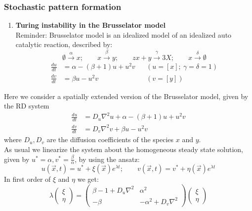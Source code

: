 \subsubsection{Stochastic pattern formation}
\begin{enumerate}[label={$\arabic*)$}]
	\item \textbf{Turing instability in the Brusselator model}\\
		Reminder: Brusselator model is an idealized model of an idealized auto catalytic reaction, described by:
		\begin{equation*}
			\emptyset \overset{\alpha}{\to} x;\qquad x\overset{\beta}{\to} y;\qquad zx+y\overset{\gamma}{\to}3X;\qquad x\overset{\delta}{\to}\emptyset
		\end{equation*}
		\begin{align*}
			\frac{du}{dt}&=\alpha-(\beta+1)u+u^2v & &(u=\left[x\right];\ \gamma=\delta=1)\\
			\frac{dv}{dt}&=\beta u-u^2v & &(v=\left[y\right])
		\end{align*}
\end{enumerate}
Here we consider a spatially extended version of the Brusselator model, given by the RD system
\begin{align*}
	\frac{du}{dt}&=D_u\nabla^2u+\alpha-(\beta +1)u+u^2v\\
	\frac{dv}{dt}&=D_v\nabla^2v+\beta u-u^2v
\end{align*}
where $D_u,D_v$ are the diffusion coefficients of the species $x$ and $y$.\\
As usual we linearize the system about the homogeneous steady state solution, given by $u^*=\alpha,v^*=\frac{\beta}{\alpha}$, by using the ansatz:
\begin{equation*}
	u(\vec{x},t)=u^*+\xi(\vec{x})e^{\lambda t};\qquad v(\vec{x},t)=v^*+\eta(\vec{x})e^{\lambda t}
\end{equation*}
In first order of $\xi$ and $\eta$ we get:
\begin{equation*}
	\lambda\begin{pmatrix} \xi \\ \eta\end{pmatrix}=\begin{pmatrix} \beta -1+D_u\nabla^2 & \alpha^2 \\ -\beta & -\alpha^2 +D_v\nabla^2\end{pmatrix}\begin{pmatrix} \xi \\ \eta \end{pmatrix}
\end{equation*}

